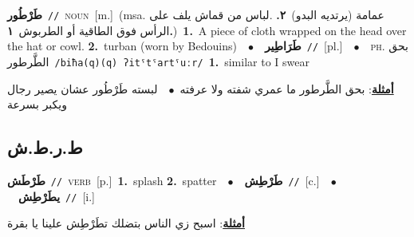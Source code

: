 \documentclass[10pt,a4paper,twoside]{article} %
\begin{document}
\begin{multicols}{2}
{\setlength\topsep{0pt}\textbf{\foreignlanguage{arabic}{طَرْطُور}}\ {\color{gray}\texttt{//}\color{black}}\ \textsc{noun}\ [m.]\ \color{gray}(msa. \foreignlanguage{arabic}{عمامة (يرتديه البدو)}~\foreignlanguage{arabic}{\textbf{٢.}}  .\foreignlanguage{arabic}{لباس من قماش يلف على الرأس فوق الطاقية أو الطربوش}~\foreignlanguage{arabic}{\textbf{١.}})\color{black}\ \textbf{1.}~A piece of cloth wrapped on the head over the hat or cowl.  \textbf{2.}~turban (worn by Bedouins)\ \ $\bullet$\ \ \setlength\topsep{0pt}\textbf{\foreignlanguage{arabic}{طَرَاطِير}}\ {\color{gray}\texttt{//}\color{black}}\ [pl.]\ \ $\bullet$\ \ \textsc{ph.} \color{gray} \foreignlanguage{arabic}{بحق الطَّرطور}\color{black}\ {\color{gray}\texttt{/{\sffamily biħa(q)(q) ʔitˤtˤartˤuːr}/}\color{black}}\ \textbf{1.}~similar to I swear\  \begin{flushright}\color{gray}\foreignlanguage{arabic}{\textbf{\underline{\foreignlanguage{arabic}{أمثلة}}}: بحق الطَّرطور ما عمري شفته ولا عرفته\ $\bullet$\ \  لبسته طَرْطُور عشان يصير رجال ويكبر بسرعة}\end{flushright}\color{black}} \vspace{2mm}

\vspace{-3mm}
\subsection*{\color{blue}\foreignlanguage{arabic}{ط.ر.ط.ش}\color{blue}{}} 

{\setlength\topsep{0pt}\textbf{\foreignlanguage{arabic}{طَرْطَش}}\ {\color{gray}\texttt{//}\color{black}}\ \textsc{verb}\ [p.]\ \textbf{1.}~splash  \textbf{2.}~spatter\ \ $\bullet$\ \ \setlength\topsep{0pt}\textbf{\foreignlanguage{arabic}{طَرْطِش}}\ {\color{gray}\texttt{//}\color{black}}\ [c.]\ \ $\bullet$\ \ \setlength\topsep{0pt}\textbf{\foreignlanguage{arabic}{يطَرْطِش}}\ {\color{gray}\texttt{//}\color{black}}\ [i.]\  \begin{flushright}\color{gray}\foreignlanguage{arabic}{\textbf{\underline{\foreignlanguage{arabic}{أمثلة}}}: اسبح زي الناس بتضلك تطَرْطِش علينا يا بقرة}\end{flushright}\color{black}} \vspace{2mm}


\end{multicols}
\end{document}
